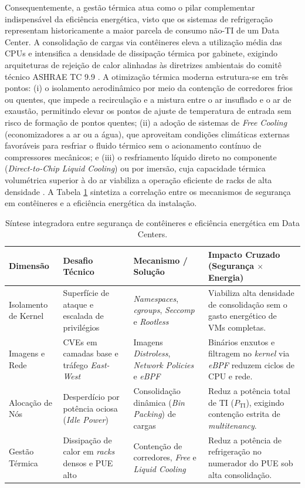 Consequentemente, a gestão térmica atua como o pilar complementar indispensável da eficiência energética, visto que os sistemas de refrigeração representam historicamente a maior parcela de
consumo não-TI de um Data Center. A consolidação de cargas via contêineres eleva a utilização média das CPUs e intensifica a densidade de dissipação térmica por gabinete, exigindo arquiteturas de rejeição de calor alinhadas às diretrizes ambientais do comitê técnico ASHRAE TC 9.9 \cite{ashrae2021thermal}. A otimização térmica moderna estrutura-se em três pontos: (i) o isolamento aerodinâmico por meio da contenção de corredores frios ou quentes, que impede a recirculação e a mistura entre o ar insuflado e o ar de exaustão, permitindo elevar os pontos de ajuste de temperatura de entrada sem risco de formação de pontos quentes; (ii) a adoção
de sistemas de \emph{Free Cooling} (economizadores a ar ou a água), que aproveitam condições climáticas externas favoráveis para resfriar o fluido térmico sem o acionamento contínuo de compressores mecânicos; e (iii) o resfriamento líquido direto no componente (\emph{Direct-to-Chip Liquid Cooling}) ou por imersão, cuja capacidade térmica volumétrica superior à do ar viabiliza a operação eficiente de racks de alta densidade \cite{ashrae2021thermal}. A Tabela \ref{tab:sintese} sintetiza a correlação entre os mecanismos de segurança em contêineres e a eficiência energética da instalação.

\begin{table}[h!]
	\centering
	\caption{Síntese integradora entre segurança de contêineres e eficiência energética em Data Centers.}
	\label{tab:sintese}
	\footnotesize
	\renewcommand{\arraystretch}{1.2}
	\begin{tabularx}{\textwidth}{@{} l X X X @{}}
		\toprule
		\textbf{Dimensão} & \textbf{Desafio Técnico} & \textbf{Mecanismo / Solução} & \textbf{Impacto Cruzado (Segurança $\times$ Energia)} \\
		\midrule
		Isolamento de Kernel & Superfície de ataque e escalada de privilégios & \textit{Namespaces}, \textit{cgroups}, \textit{Seccomp} e \textit{Rootless} & Viabiliza alta densidade de consolidação sem o gasto energético de VMs completas. \\
		Imagens e Rede & CVEs em camadas base e tráfego \textit{East-West} & Imagens \textit{Distroless}, \textit{Network Policies} e \textit{eBPF} & Binários enxutos e filtragem no \textit{kernel} via \textit{eBPF} reduzem ciclos de CPU e rede. \\
		Alocação de Nós & Desperdício por potência ociosa (\textit{Idle Power}) & Consolidação dinâmica (\textit{Bin Packing}) de cargas & Reduz a potência total de TI ($P_{\text{TI}}$), exigindo contenção estrita de \textit{multitenancy}. \\
		Gestão Térmica & Dissipação de calor em \textit{racks} densos e PUE alto & Contenção de corredores, \textit{Free} e \textit{Liquid Cooling} & Reduz a potência de refrigeração no numerador do PUE sob alta consolidação. \\
		\bottomrule
	\end{tabularx}
\end{table}

